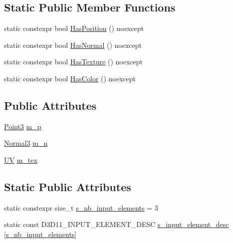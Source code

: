 \subsection*{Static Public Member Functions}
\begin{DoxyCompactItemize}
\item 
static constexpr bool \hyperlink{structmage_1_1_vertex_position_normal_texture_ade7641ccc469e344f7df535cc0d870cd}{Has\+Position} () noexcept
\item 
static constexpr bool \hyperlink{structmage_1_1_vertex_position_normal_texture_a7b7aa7f06f70b0e32ecbc42553ec8a49}{Has\+Normal} () noexcept
\item 
static constexpr bool \hyperlink{structmage_1_1_vertex_position_normal_texture_aaf6ed21e4aa9b5aa9be520f7541851a1}{Has\+Texture} () noexcept
\item 
static constexpr bool \hyperlink{structmage_1_1_vertex_position_normal_texture_a48598de027a1864b12857f537a2ac8fd}{Has\+Color} () noexcept
\end{DoxyCompactItemize}
\subsection*{Public Attributes}
\begin{DoxyCompactItemize}
\item 
\hyperlink{structmage_1_1_point3}{Point3} \hyperlink{structmage_1_1_vertex_position_normal_texture_a319f201d680d9e0a3d01b081f3d6dee8}{m\+\_\+p}
\item 
\hyperlink{structmage_1_1_normal3}{Normal3} \hyperlink{structmage_1_1_vertex_position_normal_texture_af4a15ddc9ac172226fb7e21c5f667a38}{m\+\_\+n}
\item 
\hyperlink{structmage_1_1_u_v}{UV} \hyperlink{structmage_1_1_vertex_position_normal_texture_a9429acfac77372007ea75022282341fa}{m\+\_\+tex}
\end{DoxyCompactItemize}
\subsection*{Static Public Attributes}
\begin{DoxyCompactItemize}
\item 
static constexpr size\+\_\+t \hyperlink{structmage_1_1_vertex_position_normal_texture_a0bde36712236569de4bca8308fd7a284}{s\+\_\+nb\+\_\+input\+\_\+elements} = 3
\item 
static const D3\+D11\+\_\+\+I\+N\+P\+U\+T\+\_\+\+E\+L\+E\+M\+E\+N\+T\+\_\+\+D\+E\+SC \hyperlink{structmage_1_1_vertex_position_normal_texture_a52500b6efc9c9e1a4c81eb86673770cf}{s\+\_\+input\+\_\+element\+\_\+desc} \mbox{[}\hyperlink{structmage_1_1_vertex_position_normal_texture_a0bde36712236569de4bca8308fd7a284}{s\+\_\+nb\+\_\+input\+\_\+elements}\mbox{]}
\end{DoxyCompactItemize}


